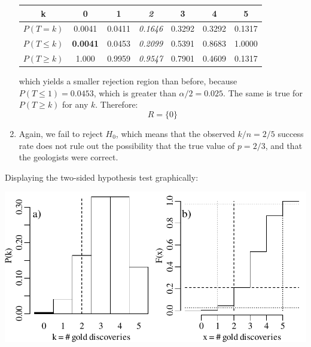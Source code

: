 \begin{enumerate}
  \begin{center}
    \begin{tabular}{ccccccc}
      k & \textbf{0} & 1 & \textit{2} & 3 & 4 & 5 \\ \hline
      $P(T=k)$ & 0.0041 & 0.0411 & \textit{0.1646} & 0.3292 & 0.3292 & 0.1317 \\
      $P({T}\leq{k})$ & \textbf{0.0041} & 0.0453 &
      \textit{0.2099} & 0.5391 & 0.8683 & 1.0000 \\
      $P({T}\geq{k})$ & 1.000 & 0.9959 & \textit{0.9547} & 0.7901 & 0.4609 & 0.1317
    \end{tabular}
  \end{center}

  \noindent which yields a smaller rejection region than before,
  because $P(T\leq{1})=0.0453$, which is greater than
  $\alpha/2=0.025$.  The same is true for $P(T\geq{k})$ for any
  $k$. Therefore:
  \[
  R = \{0\}
  \]

\item Again, we fail to reject $H_0$, which means that the observed
  $k/n=2/5$ success rate does not rule out the possibility that the
  true value of $p=2/3$, and that the geologists were correct.
  
\end{enumerate}

Displaying the two-sided hypothesis test graphically:\medskip

\noindent\begin{minipage}[t][][b]{.6\textwidth}
\includegraphics[]{../figures/2sidedbinomialrejection5.pdf}
\medskip
\end{minipage}
\begin{minipage}[t][][t]{.4\textwidth}
  \label{fig:2sidedbinomialrejection5}
\end{minipage}

